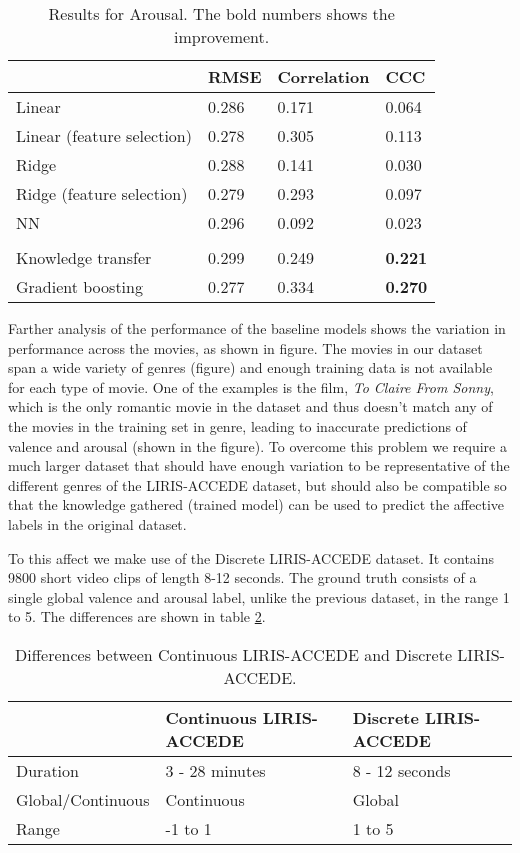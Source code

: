 \documentclass{article}
\begin{document}
\begin{table}[h]
\centering
\begin{tabular}{|l|l|l|l|}
\hline
						& RMSE		& Correlation 	& CCC 	 \\ \hline
Linear					& 0.286		& 0.171		& 0.064  \\ \hline	
Linear (feature selection)		& 0.278		& 0.305 		& 0.113	 \\ \hline
Ridge					& 0.288  		& 0.141		& 0.030	 \\ \hline
Ridge (feature selection)		& 0.279		& 0.293		& 0.097	 \\ \hline
NN						& 0.296		& 0.092		& 0.023 \\ \hline
& & & \\ \hline
Knowledge transfer 		& 0.299		& 0.249 		& \textbf{0.221}	 \\ \hline
Gradient boosting 			& 0.277 		& 0.334 		& \textbf{0.270}  \\ \hline
\end{tabular}
\caption{Results for Arousal. The bold numbers shows the improvement.}
\label{Arousal_table}
\end{table}

\indent Farther analysis of the performance of the baseline models shows the variation in performance across the movies, as shown in figure. The movies in our dataset span a wide variety of genres (figure) and enough training data is not available for each type of movie. One of the examples is the film, \textit{To Claire From Sonny}, which is the only romantic movie in the dataset and thus doesn't match any of the movies in the training set in genre, leading to inaccurate predictions of valence and arousal (shown in the figure). To overcome this problem we require a much larger dataset that should have enough variation to be representative of the different genres of the LIRIS-ACCEDE dataset, but should also be compatible so that the knowledge gathered (trained model) can be used to predict the affective labels in the original dataset.

\indent To this affect we make use of the Discrete LIRIS-ACCEDE dataset. It contains 9800 short video clips of length 8-12 seconds. The ground truth consists of a single global valence and arousal label, unlike the previous dataset, in the range 1 to 5. The differences are shown in table \ref{differences}.

\begin{table}[h]
\centering
\begin{tabular}{|l|p{2.2cm}|p{2.2cm}|}
\hline
				& Continuous LIRIS-ACCEDE	& Discrete LIRIS-ACCEDE \\ \hline
Duration			& 3 - 28 minutes			& 8 - 12 seconds		\\ \hline	
Global/Continuous	& Continuous				& Global 				\\ \hline
Range			& -1 to 1					& 1 to 5				\\ \hline
\end{tabular}
\caption{Differences between Continuous LIRIS-ACCEDE and Discrete LIRIS-ACCEDE.}
\label{differences}
\end{table}
\end{document}
